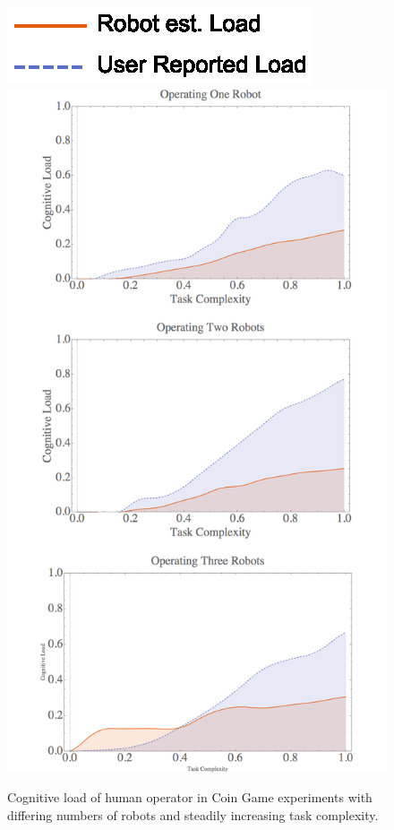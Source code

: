 \documentclass{sig-alternate}
\begin{document}

\begin{figure}  
\centering
\includegraphics[width=.25\textwidth]{final-legend.eps}
\includegraphics[width=.5\textwidth]{final-results.png}
\caption{Cognitive load of human operator in Coin Game experiments with differing numbers of robots and steadily increasing task complexity.}
\label{fig:final-results}
\end{figure}
\end{document}
